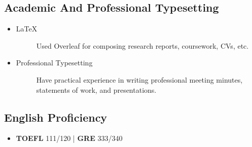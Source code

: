 \documentclass[a4paper]{article}
\begin{document}
\subsection{Academic And Professional Typesetting}
\begin{itemize}
    \item\begin{description}
        \item[\LaTeX] Used Overleaf for composing research reports, coursework, CVs, etc. 
    \end{description}
    \item \begin{description}
        \item[Professional Typesetting] Have practical experience in writing professional meeting minutes, statements of work, and presentations. 
    \end{description}
\end{itemize} 

\subsection{English Proficiency}
\begin{itemize}
    \item \textbf{TOEFL} 111/120 | \textbf{GRE} 333/340 
\end{itemize}
\end{document}
